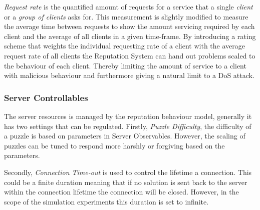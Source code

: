 \emph{Request rate} is the quantified amount of requests for a service that a single \emph{client} or a \emph{group of clients} asks for. This measurement is slightly modified to measure the average time between requests to show the amount servicing required by each client and the average of all clients in a given time-frame. By introducing a rating scheme that weights the individual requesting rate of a client with the average request rate of all clients the Reputation System can hand out problems scaled to the behaviour of each client. Thereby limiting the amount of service to a client with malicious behaviour and furthermore giving a natural limit to a DoS attack.


\subsubsection{Server Controllables}
The server resources is managed by the reputation behaviour model, generally it has two settings that can be regulated.
Firstly, \emph{Puzzle Difficulty}, the difficulty of a puzzle is based on parameters in Server Observables. However, the scaling of puzzles can be tuned to respond more harshly or forgiving based on the parameters.

Secondly, \emph{Connection Time-out} is used to control the lifetime a connection. This could be a finite duration meaning that if no solution is sent back to the server within the connection lifetime the connection will be closed.
However, in the scope of the simulation experiments this duration is set to infinite. %

